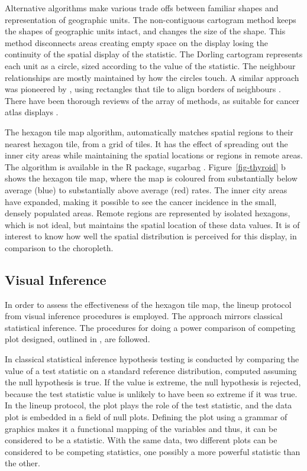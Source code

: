 \documentclass[
doublespace,
  times]{anzsauth}
\begin{document}
Alternative algorithms make various trade offs between familiar shapes
and representation of geographic units. The non-contiguous cartogram
method \citep{NAC} keeps the shapes of geographic units intact, and
changes the size of the shape. This method disconnects areas creating
empty space on the display losing the continuity of the spatial display
of the statistic. The Dorling cartogram \citep{ACTUC} represents each
unit as a circle, sized according to the value of the statistic. The
neighbour relationships are mostly maintained by how the circles touch.
A similar approach was pioneered by \citet{RSCW}, using rectangles that
tile to align borders of neighbours \citep{CDWCS}. There have been
thorough reviews of the array of methods, as suitable for cancer atlas
displays \citep[\citet{BCM}]{review}.

The hexagon tile map algorithm, automatically matches spatial regions to
their nearest hexagon tile, from a grid of tiles. It has the effect of
spreading out the inner city areas while maintaining the spatial
locations or regions in remote areas. The algorithm is available in the
R package, sugarbag \citep{sugarbag}. Figure~\ref{fig-thyroid} b shows
the hexagon tile map, where the map is coloured from substantially below
average (blue) to substantially above average (red) rates. The inner
city areas have expanded, making it possible to see the cancer incidence
in the small, densely populated areas. Remote regions are represented by
isolated hexagons, which is not ideal, but maintains the spatial
location of these data values. It is of interest to know how well the
spatial distribution is perceived for this display, in comparison to the
choropleth.

\subsection{Visual Inference}\label{visual-inference}

In order to assess the effectiveness of the hexagon tile map, the lineup
protocol \citep[\citet{GIIV}]{BCHLLSW09} from visual inference
procedures is employed. The approach mirrors classical statistical
inference. The procedures for doing a power comparison of competing plot
designed, outlined in \citet{GTPCCD}, are followed.

In classical statistical inference hypothesis testing is conducted by
comparing the value of a test statistic on a standard reference
distribution, computed assuming the null hypothesis is true. If the
value is extreme, the null hypothesis is rejected, because the test
statistic value is unlikely to have been so extreme if it was true. In
the lineup protocol, the plot plays the role of the test statistic, and
the data plot is embedded in a field of null plots. Defining the plot
using a grammar of graphics \citep{ggplot2} makes it a functional
mapping of the variables and thus, it can be considered to be a
statistic. With the same data, two different plots can be considered to
be competing statistics, one possibly a more powerful statistic than the
other.
\end{document}
